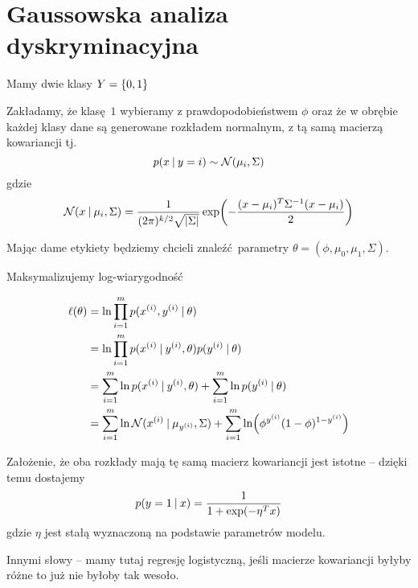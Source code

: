 \section{Gaussowska analiza dyskryminacyjna}

Mamy dwie klasy \( Y = \set{0, 1} \)

Zakładamy, że klasę \( 1 \) wybieramy z prawdopodobieństwem \( \phi \) oraz że w obrębie każdej klasy dane są generowane rozkładem normalnym, z tą samą macierzą kowariancji tj.
\[
	p(x \:\vert\: y = i) \sim \operatorname{\mathcal{N}}(\mu_i, \Sigma)
\]
gdzie
\[
	\Normal(x \given \mu_i, \Sigma) = \frac{1}{(2\pi)^{k/2}\sqrt{\card{\Sigma}}}
	\exp\pars{-\frac{(x - \mu_i)^T\Sigma^{-1}(x - \mu_i)}{2}}
\]

Mając dame etykiety będziemy chcieli znaleźć parametry \( \theta = (\phi, \mu_0, \mu_1, \Sigma) \).

Maksymalizujemy log-wiarygodność

\begin{align*}
	\ell(\theta)
	 & = \ln \prod_{i=1}^m p(x^{(i)}, y^{(i)} \given \theta)                                                                              \\
	 & = \ln \prod_{i=1}^m p(x^{(i)} \given y^{(i)}, \theta) p(y^{(i)} \given \theta)                                                     \\
	 & = \sum_{i=1}^m \ln p(x^{(i)} \given y^{(i)}, \theta) + \sum_{i=1}^m \ln p(y^{(i)} \given \theta)                                   \\
	 & = \sum_{i=1}^m \ln \Normal(x^{(i)} \given \mu_{y^{(i)}}, \Sigma) + \sum_{i=1}^m \ln \pars{\phi^{y^{(i)}}(1 -  \phi)^{1 - y^{(i)}}}
\end{align*}

Założenie, że oba rozkłady mają tę samą macierz kowariancji jest istotne -- dzięki temu dostajemy
\[
	p(y = 1 \:\vert\: x) = \frac{1}{1 + \exp(-\eta^T x)}
\]
gdzie \( \eta \) jest stałą wyznaczoną na podstawie parametrów modelu.

Innymi słowy -- mamy tutaj regresję logistyczną, jeśli macierze kowariancji byłyby różne to już nie byłoby tak wesoło.